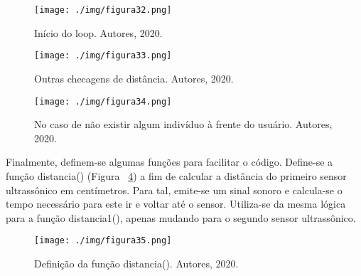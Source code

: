\documentclass[10pt,twocolumn,letterpaper]{article}
\begin{document}
{
\begin{figure}[!h]
\begin{center}
   \texttt{[image: ./img/figura32.png]}
\end{center}
   \caption{  Início do loop. Autores, 2020.  }
\label{fig:figura32}
\end{figure}
} 
{
\begin{figure}[!h]
\begin{center}
   \texttt{[image: ./img/figura33.png]}
\end{center}
   \caption{   Outras checagens de distância. Autores, 2020. }
\label{fig:figura33}
\end{figure}
} 
{
\begin{figure}[!h]
\begin{center}
   \texttt{[image: ./img/figura34.png]}
\end{center}
   \caption{   No caso de não existir algum indivíduo à frente do usuário. Autores, 2020.  }
\label{fig:figura34}
\end{figure}
} 

Finalmente, definem-se algumas funções para facilitar o código. Define-se a função distancia() (Figura ~\ref{fig:figura35}) a fim de calcular a distância do primeiro sensor ultrassônico em centímetros. Para tal, emite-se um sinal sonoro e calcula-se o tempo necessário para este ir e voltar até o sensor. Utiliza-se da mesma lógica para a função distancia1(), apenas mudando para o segundo sensor ultrassônico.

{
\begin{figure}[!h]
\begin{center}
   \texttt{[image: ./img/figura35.png]}
\end{center}
   \caption{    Definição da função distancia(). Autores, 2020.  }
\label{fig:figura35}
\end{figure}
} 

\end{document}
